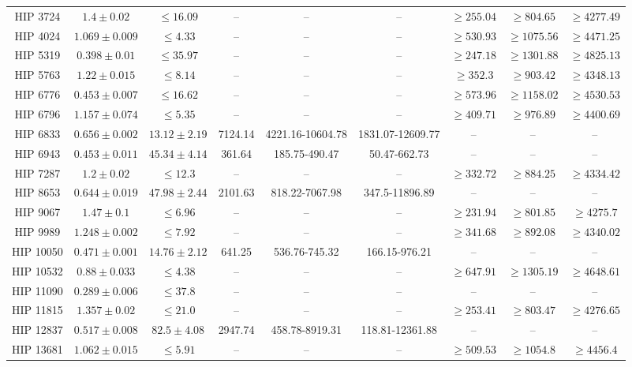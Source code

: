{\begin{longtable}{|c|c|c|c|c|c|c|c|c|}
HIP 3724 & $ 1.4 \pm 0.02 $ & $\le 16.09 $ &-- &-- &-- & $\ge 255.04 $ & $\ge 804.65 $ & $\ge 4277.49 $ \\
HIP 4024 & $ 1.069 \pm 0.009 $ & $\le 4.33 $ &-- &-- &-- & $\ge 530.93 $ & $\ge 1075.56 $ & $\ge 4471.25 $ \\
HIP 5319 & $ 0.398 \pm 0.01 $ & $\le 35.97 $ &-- &-- &-- & $\ge 247.18 $ & $\ge 1301.88 $ & $\ge 4825.13 $ \\
HIP 5763 & $ 1.22 \pm 0.015 $ & $\le 8.14 $ &-- &-- &-- & $\ge 352.3 $ & $\ge 903.42 $ & $\ge 4348.13 $ \\
HIP 6776 & $ 0.453 \pm 0.007 $ & $\le 16.62 $ &-- &-- &-- & $\ge 573.96 $ & $\ge 1158.02 $ & $\ge 4530.53 $ \\
HIP 6796 & $ 1.157 \pm 0.074 $ & $\le 5.35 $ &-- &-- &-- & $\ge 409.71 $ & $\ge 976.89 $ & $\ge 4400.69 $ \\
HIP 6833 & $ 0.656 \pm 0.002 $ & $ 13.12 \pm 2.19 $ & 7124.14 & 4221.16-10604.78 & 1831.07-12609.77 &-- &-- &-- \\
HIP 6943 & $ 0.453 \pm 0.011 $ & $ 45.34 \pm 4.14 $ & 361.64 & 185.75-490.47 & 50.47-662.73 &-- &-- &-- \\
HIP 7287 & $ 1.2 \pm 0.02 $ & $\le 12.3 $ &-- &-- &-- & $\ge 332.72 $ & $\ge 884.25 $ & $\ge 4334.42 $ \\
HIP 8653 & $ 0.644 \pm 0.019 $ & $ 47.98 \pm 2.44 $ & 2101.63 & 818.22-7067.98 & 347.5-11896.89 &-- &-- &-- \\
HIP 9067 & $ 1.47 \pm 0.1 $ & $\le 6.96 $ &-- &-- &-- & $\ge 231.94 $ & $\ge 801.85 $ & $\ge 4275.7 $ \\
HIP 9989 & $ 1.248 \pm 0.002 $ & $\le 7.92 $ &-- &-- &-- & $\ge 341.68 $ & $\ge 892.08 $ & $\ge 4340.02 $ \\
HIP 10050 & $ 0.471 \pm 0.001 $ & $ 14.76 \pm 2.12 $ & 641.25 & 536.76-745.32 & 166.15-976.21 &-- &-- &-- \\
HIP 10532 & $ 0.88 \pm 0.033 $ & $\le 4.38 $ &-- &-- &-- & $\ge 647.91 $ & $\ge 1305.19 $ & $\ge 4648.61 $ \\
HIP 11090 & $ 0.289 \pm 0.006 $ & $\le 37.8 $ & -- & -- &-- & -- & -- & -- \\
HIP 11815 & $ 1.357 \pm 0.02 $ & $\le 21.0 $ &-- &-- &-- & $\ge 253.41 $ & $\ge 803.47 $ & $\ge 4276.65 $ \\
HIP 12837 & $ 0.517 \pm 0.008 $ & $ 82.5 \pm 4.08 $ & 2947.74 & 458.78-8919.31 & 118.81-12361.88 &-- &-- &-- \\
HIP 13681 & $ 1.062 \pm 0.015 $ & $\le 5.91 $ &-- &-- &-- & $\ge 509.53 $ & $\ge 1054.8 $ & $\ge 4456.4 $ \\

\end{longtable}}

